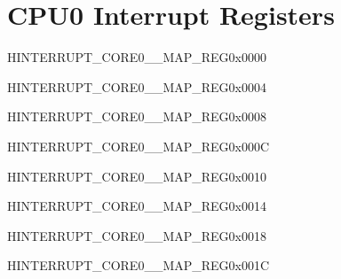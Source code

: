 \chapter{CPU0 Interrupt Registers}

\begin{register}{H}{INTERRUPT\_CORE0\_\_MAP\_REG}{0x0000}\label{regdesc:INTERRUPTCORE0MACINTRMAPREG}
\end{register}
\vspace{-3em}

\begin{register}{H}{INTERRUPT\_CORE0\_\_MAP\_REG}{0x0004}\label{regdesc:INTERRUPTCORE0MACNMIMAPREG}
\end{register}
\vspace{-3em}

\begin{register}{H}{INTERRUPT\_CORE0\_\_MAP\_REG}{0x0008}\label{regdesc:INTERRUPTCORE0PWRINTRMAPREG}
\end{register}
\vspace{-3em}

\begin{register}{H}{INTERRUPT\_CORE0\_\_MAP\_REG}{0x000C}\label{regdesc:INTERRUPTCORE0BBINTMAPREG}
\end{register}
\vspace{-3em}

\begin{register}{H}{INTERRUPT\_CORE0\_\_MAP\_REG}{0x0010}\label{regdesc:INTERRUPTCORE0BTMACINTMAPREG}
\end{register}
\vspace{-3em}

\begin{register}{H}{INTERRUPT\_CORE0\_\_MAP\_REG}{0x0014}\label{regdesc:INTERRUPTCORE0BTBBINTMAPREG}
\end{register}
\vspace{-3em}

\begin{register}{H}{INTERRUPT\_CORE0\_\_MAP\_REG}{0x0018}\label{regdesc:INTERRUPTCORE0BTBBNMIMAPREG}
\end{register}
\vspace{-3em}

\begin{register}{H}{INTERRUPT\_CORE0\_\_MAP\_REG}{0x001C}\label{regdesc:INTERRUPTCORE0RWBTIRQMAPREG}
\end{register}
\vspace{-3em}

